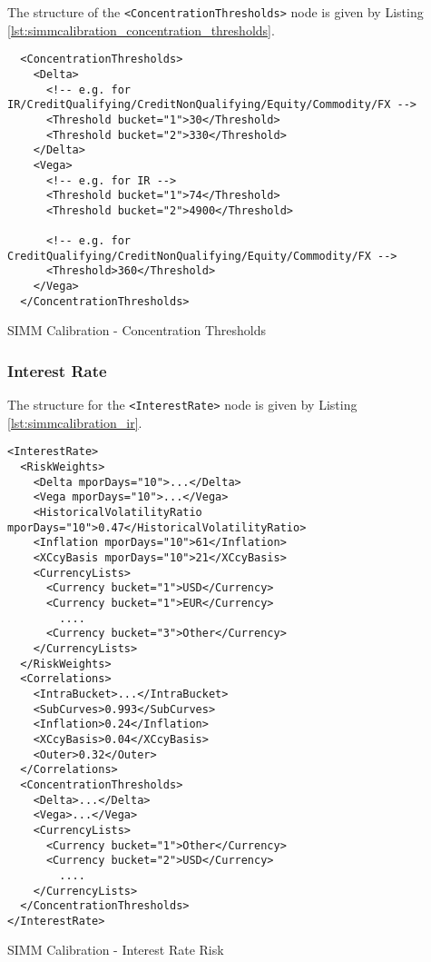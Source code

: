 The structure of the {\tt <ConcentrationThresholds>} node is given by Listing \ref{lst:simmcalibration_concentration_thresholds}.

\begin{listing}[H]
\begin{verbatim}
  <ConcentrationThresholds>
    <Delta>
      <!-- e.g. for IR/CreditQualifying/CreditNonQualifying/Equity/Commodity/FX -->
      <Threshold bucket="1">30</Threshold>
      <Threshold bucket="2">330</Threshold>
    </Delta>
    <Vega>
      <!-- e.g. for IR -->
      <Threshold bucket="1">74</Threshold>
      <Threshold bucket="2">4900</Threshold>

      <!-- e.g. for CreditQualifying/CreditNonQualifying/Equity/Commodity/FX -->
      <Threshold>360</Threshold>
    </Vega>
  </ConcentrationThresholds>
\end{verbatim}
\caption{SIMM Calibration - Concentration Thresholds}
\label{lst:simmcalibration_concentration_thresholds}
\end{listing}

\subsubsection{Interest Rate}
The structure for the {\tt <InterestRate>} node is given by Listing \ref{lst:simmcalibration_ir}.

\begin{listing}[H]
\begin{verbatim}
<InterestRate>
  <RiskWeights>
    <Delta mporDays="10">...</Delta>
    <Vega mporDays="10">...</Vega>
    <HistoricalVolatilityRatio mporDays="10">0.47</HistoricalVolatilityRatio>
    <Inflation mporDays="10">61</Inflation>
    <XCcyBasis mporDays="10">21</XCcyBasis>
    <CurrencyLists>
      <Currency bucket="1">USD</Currency>
      <Currency bucket="1">EUR</Currency>
        ....
      <Currency bucket="3">Other</Currency>
    </CurrencyLists>
  </RiskWeights>
  <Correlations>
    <IntraBucket>...</IntraBucket>
    <SubCurves>0.993</SubCurves>
    <Inflation>0.24</Inflation>
    <XCcyBasis>0.04</XCcyBasis>
    <Outer>0.32</Outer>
  </Correlations>
  <ConcentrationThresholds>
    <Delta>...</Delta>
    <Vega>...</Vega>
    <CurrencyLists>
      <Currency bucket="1">Other</Currency>
      <Currency bucket="2">USD</Currency>
        ....
    </CurrencyLists>
  </ConcentrationThresholds>
</InterestRate>
\end{verbatim}
\caption{SIMM Calibration - Interest Rate Risk}
\label{lst:simmcalibration_ir}
\end{listing}

